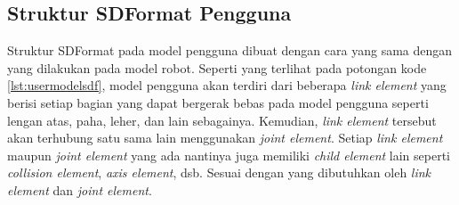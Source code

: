 \subsection{Struktur SDFormat Pengguna}
\label{subsec:sdformatpengguna}



Struktur SDFormat pada model pengguna dibuat dengan cara yang sama dengan yang dilakukan pada model robot.
Seperti yang terlihat pada potongan kode \ref{lst:usermodelsdf},
  model pengguna akan terdiri dari beberapa \emph{link element} yang berisi setiap bagian yang dapat bergerak bebas pada model pengguna seperti lengan atas, paha, leher, dan lain sebagainya.
Kemudian, \emph{link element} tersebut akan terhubung satu sama lain menggunakan \emph{joint element}.
Setiap \emph{link element} maupun \emph{joint element} yang ada nantinya juga memiliki \emph{child element} lain seperti \emph{collision element}, \emph{axis element}, dsb. Sesuai dengan yang dibutuhkan oleh \emph{link element} dan \emph{joint element}.
